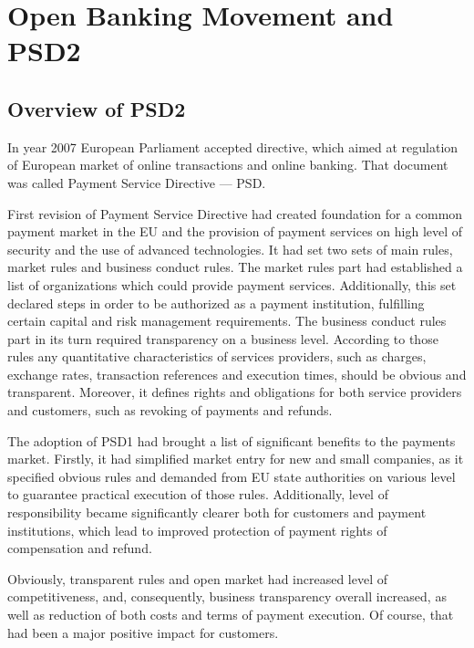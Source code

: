
\section{Open Banking Movement and PSD2}
\label{sec:psd2}

\subsection{Overview of PSD2}

In year 2007 European Parliament accepted directive, which aimed at regulation of European market of online transactions and online banking. That document was called Payment Service Directive — PSD.
\cite{psd1}

First revision of Payment Service Directive had created foundation for a common payment market in the EU and the provision of payment services on high level of security and the use of advanced technologies. 
It had set two sets of main rules, market rules and business conduct rules.
The market rules part had established a list of organizations which could provide payment services. Additionally, this set declared steps in order to be authorized as a payment institution, fulfilling certain capital and risk management requirements. 
The business conduct rules part in its turn required transparency on a business level. According to those rules any quantitative characteristics of services providers, such as charges, exchange rates, transaction references and execution times, should be obvious and transparent. Moreover, it defines rights and obligations for both service providers and customers, such as revoking of payments and refunds.

The adoption of PSD1 had brought a list of significant benefits to the payments market.
Firstly, it had simplified market entry for new and small companies, as it specified obvious rules and demanded from EU state authorities on various level to guarantee practical execution of those rules.
Additionally, level of responsibility became significantly clearer both for customers and payment institutions, which lead to improved protection of payment rights of compensation and refund.

Obviously, transparent rules and open market had increased level of competitiveness, and, consequently, business transparency overall increased, as well as reduction of both costs and terms of payment execution.
Of course, that had been a major positive impact for customers.

